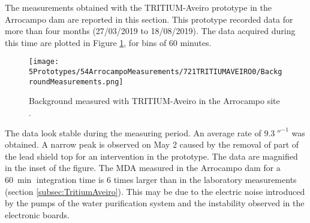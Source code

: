 
The measurements obtained with the TRITIUM-Aveiro prototype in the Arrocampo dam are reported in this section. This prototype recorded data for more than four months (27/03/2019 to 18/08/2019). The data acquired during this time are plotted in Figure \ref{fig:BackgroundArrocampoAveiro}, for bins of 60 minutes.
\begin{figure}[h]
\centering
\texttt{[image: 5Prototypes/54ArrocampoMeasurements/721TRITIUMAVEIRO0/BackgroundMeasurements.png]}
\caption{Background measured with TRITIUM-Aveiro in the Arrocampo site \cite{ExperimentalPaperCarlos}.\label{fig:BackgroundArrocampoAveiro}}
\end{figure}
The data look stable during the measuring period. An average rate of $9.3~\second^{-1}$ was obtained. A narrow peak is observed on May 2 caused by the removal of part of the lead shield top for an intervention in the prototype. The data are magnified in the inset of the figure. The MDA measured in the Arrocampo dam for a $60~\min$ integration time is 6 times larger than in the laboratory measurements (section \ref{subsec:TritiumAveiro}). This may be due to the electric noise introduced by the pumps of the water purification system and the instability observed in the electronic boards.


